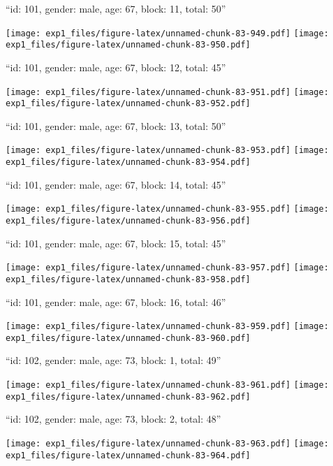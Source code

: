 \documentclass[11pt,,]{article}
\begin{document}
\newpage
[1] 

``id: 101, gender: male, age: 67, block: 11, total: 50''

\texttt{[image: exp1\_files/figure-latex/unnamed-chunk-83-949.pdf]}
\texttt{[image: exp1\_files/figure-latex/unnamed-chunk-83-950.pdf]}

\newpage
[1] 

``id: 101, gender: male, age: 67, block: 12, total: 45''

\texttt{[image: exp1\_files/figure-latex/unnamed-chunk-83-951.pdf]}
\texttt{[image: exp1\_files/figure-latex/unnamed-chunk-83-952.pdf]}

\newpage
[1] 

``id: 101, gender: male, age: 67, block: 13, total: 50''

\texttt{[image: exp1\_files/figure-latex/unnamed-chunk-83-953.pdf]}
\texttt{[image: exp1\_files/figure-latex/unnamed-chunk-83-954.pdf]}

\newpage
[1] 

``id: 101, gender: male, age: 67, block: 14, total: 45''

\texttt{[image: exp1\_files/figure-latex/unnamed-chunk-83-955.pdf]}
\texttt{[image: exp1\_files/figure-latex/unnamed-chunk-83-956.pdf]}

\newpage
[1] 

``id: 101, gender: male, age: 67, block: 15, total: 45''

\texttt{[image: exp1\_files/figure-latex/unnamed-chunk-83-957.pdf]}
\texttt{[image: exp1\_files/figure-latex/unnamed-chunk-83-958.pdf]}

\newpage
[1] 

``id: 101, gender: male, age: 67, block: 16, total: 46''

\texttt{[image: exp1\_files/figure-latex/unnamed-chunk-83-959.pdf]}
\texttt{[image: exp1\_files/figure-latex/unnamed-chunk-83-960.pdf]}

\newpage
[1] 

``id: 102, gender: male, age: 73, block: 1, total: 49''

\texttt{[image: exp1\_files/figure-latex/unnamed-chunk-83-961.pdf]}
\texttt{[image: exp1\_files/figure-latex/unnamed-chunk-83-962.pdf]}

\newpage
[1] 

``id: 102, gender: male, age: 73, block: 2, total: 48''

\texttt{[image: exp1\_files/figure-latex/unnamed-chunk-83-963.pdf]}
\texttt{[image: exp1\_files/figure-latex/unnamed-chunk-83-964.pdf]}
\end{document}
